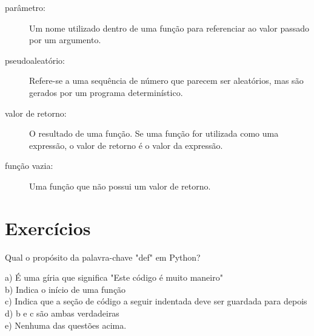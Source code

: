 \begin{description}
\item[parâmetro:] Um nome utilizado dentro de uma função para referenciar ao
valor passado por um argumento.

\item[pseudoaleatório:] Refere-se a uma sequência de número que parecem ser
aleatórios, mas são gerados por um programa determinístico.

\item[valor de retorno:] O resultado de uma função. Se uma função for utilizada
como uma expressão, o valor de retorno é o valor da expressão.

\item[função vazia:] Uma função que não possui um valor de retorno.


\end{description}


\section{Exercícios}

\begin{ex}
Qual o propósito da palavra-chave "def" em Python?


a) É uma gíria que significa "Este código é muito maneiro"\\
b) Indica o início de uma função\\
c) Indica que a seção de código a seguir indentada deve ser guardada para depois\\
d) b e c são ambas verdadeiras\\
e) Nenhuma das questões acima.

\end{ex}

